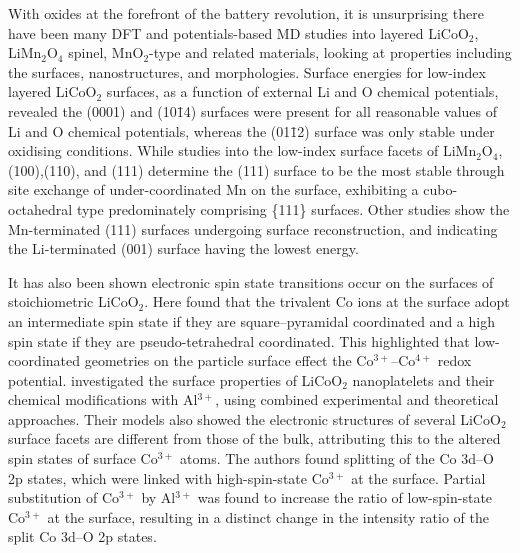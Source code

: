 \documentclass[../main.tex]{subfiles}
\begin{document}
With oxides at the forefront of the battery revolution, it is unsurprising there have been many DFT and potentials-based MD studies into layered LiCoO$_2$, LiMn$_2$O$_4$ spinel, MnO$_2$-type and related materials, looking at properties including the surfaces, nanostructures, and morphologies.\cite{kramer2009tailoring,xu2011identifying, daheron2009surface,kim2012first,benedek2011simulation,karim2013surface,leung2012first, tompsett2013nanostructuring} Surface energies for low-index layered LiCoO$_2$ surfaces, as a function of external Li and O chemical potentials, revealed the (0001) and (10\={1}4) surfaces were present for all reasonable values of Li and O chemical potentials, whereas the (01\={1}2) surface was only stable under oxidising conditions. \cite{kramer2009tailoring} While studies into the low-index surface facets of LiMn$_2$O$_4$, (100),(110), and (111) determine the (111) surface to be the most stable through site exchange of under-coordinated Mn on the surface, exhibiting a cubo-octahedral type predominately comprising \{111\} surfaces. \cite{karim2013surface} Other studies show the Mn-terminated (111) surfaces undergoing surface reconstruction, and indicating the Li-terminated (001) surface having the lowest energy. \cite{benedek2011simulation}

It has also been shown electronic spin state transitions occur on the surfaces of stoichiometric LiCoO$_2$. Here \citeauthor{qian2012electronic} found that the trivalent Co ions at the surface adopt an intermediate spin state if they are square–pyramidal coordinated and a high spin state if they are pseudo-tetrahedral coordinated. This highlighted that low-coordinated geometries on the particle surface effect the Co$^{3+}$–Co$^{4+}$ redox potential. \cite{qian2012electronic} \citeauthor{hong2019electronic} investigated the surface properties of LiCoO$_2$ nanoplatelets and their chemical modifications with Al$^{3+}$, using combined experimental and theoretical approaches.\cite{hong2019electronic} Their models also showed the electronic structures of several LiCoO$_2$ surface facets are different from those of the bulk, attributing this to the altered spin states of surface Co$^{3+}$ atoms. The authors found splitting of the Co 3d–O 2p states, which were linked with high-spin-state Co$^{3+}$ at the surface. Partial substitution of Co$^{3+}$ by Al$^{3+}$ was found to increase the ratio of low-spin-state Co$^{3+}$ at the surface, resulting in a distinct change in the intensity ratio of the split Co 3d–O 2p states. 
\end{document}
